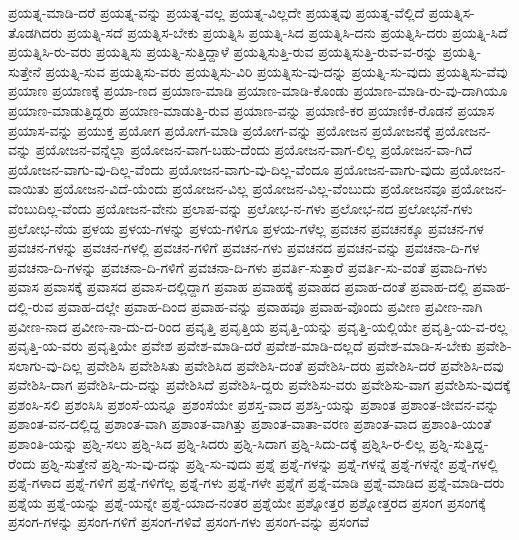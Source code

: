 {ಪ್ರಯತ್ನ-ಮಾಡಿ-ದರೆ
ಪ್ರಯತ್ನ-ವನ್ನು
ಪ್ರಯತ್ನ-ವಲ್ಲ
ಪ್ರಯತ್ನ-ವಿಲ್ಲದೇ
ಪ್ರಯತ್ನವು
ಪ್ರಯತ್ನ-ವೆಲ್ಲಿದೆ
ಪ್ರಯತ್ನಿಸ-ತೊಡಗಿದರು
ಪ್ರಯತ್ನಿ-ಸದೆ
ಪ್ರಯತ್ನಿಸ-ಬೇಕು
ಪ್ರಯತ್ನಿಸಿ
ಪ್ರಯತ್ನಿ-ಸಿದ
ಪ್ರಯತ್ನಿಸಿ-ದನು
ಪ್ರಯತ್ನಿಸಿ-ದರು
ಪ್ರಯತ್ನಿ-ಸಿದೆ
ಪ್ರಯತ್ನಿಸಿ-ರು-ವರು
ಪ್ರಯತ್ನಿಸು
ಪ್ರಯತ್ನಿ-ಸುತ್ತಿದ್ದಾಳೆ
ಪ್ರಯತ್ನಿಸುತ್ತಿ-ರುವ
ಪ್ರಯತ್ನಿಸುತ್ತಿ-ರುವ-ವ-ರನ್ನು
ಪ್ರಯತ್ನಿ-ಸುತ್ತೇನೆ
ಪ್ರಯತ್ನಿ-ಸುವ
ಪ್ರಯತ್ನಿಸು-ವರು
ಪ್ರಯತ್ನಿಸು-ವಿರಿ
ಪ್ರಯತ್ನಿಸು-ವು-ದನ್ನು
ಪ್ರಯತ್ನಿ-ಸು-ವುದು
ಪ್ರಯತ್ನಿಸು-ವೆವು
ಪ್ರಯಾಣ
ಪ್ರಯಾಣಕ್ಕೆ
ಪ್ರಯಾ-ಣದ
ಪ್ರಯಾಣ-ಮಾಡಿ
ಪ್ರಯಾಣ-ಮಾಡಿ-ಕೊಂಡು
ಪ್ರಯಾಣ-ಮಾಡಿ-ರು-ವು-ದಾಗಿಯೂ
ಪ್ರಯಾಣ-ಮಾಡುತ್ತಿದ್ದರು
ಪ್ರಯಾಣ-ಮಾಡುತ್ತಿ-ರುವ
ಪ್ರಯಾಣ-ವನ್ನು
ಪ್ರಯಾಣಿ-ಕರ
ಪ್ರಯಾಣಿಕ-ರೊಡನೆ
ಪ್ರಯಾಸ
ಪ್ರಯಾಸ-ವನ್ನು
ಪ್ರಯುಕ್ತ
ಪ್ರಯೋಗ
ಪ್ರಯೋಗ-ಮಾಡಿ
ಪ್ರಯೋಗ-ವನ್ನು
ಪ್ರಯೋಜನ
ಪ್ರಯೋಜನಕ್ಕೆ
ಪ್ರಯೋಜನ-ವನ್ನು
ಪ್ರಯೋಜನ-ವನ್ನೆಲ್ಲಾ
ಪ್ರಯೋಜನ-ವಾಗ-ಬಹು-ದೆಂದು
ಪ್ರಯೋಜನ-ವಾಗ-ಲಿಲ್ಲ
ಪ್ರಯೋಜನ-ವಾ-ಗಿದೆ
ಪ್ರಯೋಜನ-ವಾಗು-ವು-ದಿಲ್ಲ-ವೆಂದು
ಪ್ರಯೋಜನ-ವಾಗು-ವು-ದಿಲ್ಲ-ವೆಂದೂ
ಪ್ರಯೋಜನ-ವಾಗು-ವುದು
ಪ್ರಯೋಜನ-ವಾಯಿತು
ಪ್ರಯೋಜನ-ವಿದೆ-ಯೆಂದು
ಪ್ರಯೋಜನ-ವಿಲ್ಲ
ಪ್ರಯೋಜನ-ವಿಲ್ಲ-ವೆಂಬುದು
ಪ್ರಯೋಜನವೂ
ಪ್ರಯೋಜನ-ವೆಂಬುದಿಲ್ಲ-ವೆಂದು
ಪ್ರಯೋಜನ-ವೇನು
ಪ್ರಲಾಪ-ವನ್ನು
ಪ್ರಲೋಭ-ನ-ಗಳು
ಪ್ರಲೋಭ-ನದ
ಪ್ರಲೋಭನೆ-ಗಳು
ಪ್ರಲೋಭ-ನೆಯ
ಪ್ರಳಯ
ಪ್ರಳಯ-ಗಳನ್ನು
ಪ್ರಳಯ-ಗಳಿಗೂ
ಪ್ರಳಯ-ಗಳೆಲ್ಲ
ಪ್ರವಚನ
ಪ್ರವಚನಕ್ಕೂ
ಪ್ರವಚನ-ಗಳ
ಪ್ರವಚನ-ಗಳನ್ನು
ಪ್ರವಚನ-ಗಳಲ್ಲಿ
ಪ್ರವಚನ-ಗಳಿಗೆ
ಪ್ರವಚನ-ಗಳು
ಪ್ರವಚನದ
ಪ್ರವಚನ-ವನ್ನು
ಪ್ರವಚನಾ-ದಿ-ಗಳ
ಪ್ರವಚನಾ-ದಿ-ಗಳನ್ನು
ಪ್ರವಚನಾ-ದಿ-ಗಳಿಗೆ
ಪ್ರವಚನಾ-ದಿ-ಗಳು
ಪ್ರವರ್ತಿ-ಸುತ್ತಾರೆ
ಪ್ರವರ್ತಿ-ಸು-ವಂತೆ
ಪ್ರವಾದಿ-ಗಳು
ಪ್ರವಾಸ
ಪ್ರವಾಸಕ್ಕೆ
ಪ್ರವಾಸದ
ಪ್ರವಾಸ-ದಲ್ಲಿದ್ದಾಗ
ಪ್ರವಾಹ
ಪ್ರವಾಹಕ್ಕೆ
ಪ್ರವಾಹದ
ಪ್ರವಾಹ-ದಂತೆ
ಪ್ರವಾಹ-ದಲ್ಲಿ
ಪ್ರವಾಹ-ದಲ್ಲಿ-ರುವ
ಪ್ರವಾಹ-ದಲ್ಲೇ
ಪ್ರವಾಹ-ದಿಂದ
ಪ್ರವಾಹ-ವನ್ನು
ಪ್ರವಾಹವೂ
ಪ್ರವಾಹ-ವೊಂದು
ಪ್ರವೀಣ
ಪ್ರವೀಣ-ನಾಗಿ
ಪ್ರವೀಣ-ನಾದ
ಪ್ರವೀಣ-ನಾ-ದು-ದ-ರಿಂದ
ಪ್ರವೃತ್ತಿ
ಪ್ರವೃತ್ತಿಯ
ಪ್ರವೃತ್ತಿ-ಯನ್ನು
ಪ್ರವೃತ್ತಿ-ಯಲ್ಲಿಯೇ
ಪ್ರವೃತ್ತಿ-ಯ-ವ-ರಲ್ಲ
ಪ್ರವೃತ್ತಿ-ಯ-ವರು
ಪ್ರವೃತ್ತಿಯೇ
ಪ್ರವೇಶ
ಪ್ರವೇಶ-ಮಾಡಿ-ದರೆ
ಪ್ರವೇಶ-ಮಾಡಿ-ದಲ್ಲದೆ
ಪ್ರವೇಶ-ಮಾಡಿ-ಸ-ಬೇಕು
ಪ್ರವೇಶಿ-ಸಲಾಗು-ವು-ದಿಲ್ಲ
ಪ್ರವೇಶಿಸಿ
ಪ್ರವೇಶಿಸಿತು
ಪ್ರವೇಶಿಸಿದ
ಪ್ರವೇಶಿಸಿ-ದಂತೆ
ಪ್ರವೇಶಿಸಿ-ದರು
ಪ್ರವೇಶಿಸಿ-ದರೆ
ಪ್ರವೇಶಿಸಿ-ದವು
ಪ್ರವೇಶಿಸಿ-ದಾಗ
ಪ್ರವೇಶಿಸಿ-ದು-ದನ್ನು
ಪ್ರವೇಶಿಸಿದೆ
ಪ್ರವೇಶಿಸಿ-ದ್ದರು
ಪ್ರವೇಶಿಸು-ವರು
ಪ್ರವೇಶಿಸು-ವಾಗ
ಪ್ರವೇಶಿಸು-ವುದಕ್ಕೆ
ಪ್ರಶಂಸಿ-ಸಲಿ
ಪ್ರಶಂಸಿಸಿ
ಪ್ರಶಂಸೆ-ಯನ್ನೂ
ಪ್ರಶಂಸೆಯೇ
ಪ್ರಶಸ್ತ-ವಾದ
ಪ್ರಶಸ್ತಿ-ಯನ್ನು
ಪ್ರಶಾಂತ
ಪ್ರಶಾಂತ-ಜೀವನ-ವನ್ನು
ಪ್ರಶಾಂತ-ವನ-ದಲ್ಲಿದ್ದ
ಪ್ರಶಾಂತ-ವಾಗಿ
ಪ್ರಶಾಂತ-ವಾಗಿತ್ತು
ಪ್ರಶಾಂತ-ವಾತಾ-ವರಣ
ಪ್ರಶಾಂತ-ವಾದ
ಪ್ರಶಾಂತಿ-ಯಂತೆ
ಪ್ರಶಾಂತಿ-ಯನ್ನು
ಪ್ರಶ್ನಿ-ಸಲು
ಪ್ರಶ್ನಿ-ಸಿದ
ಪ್ರಶ್ನಿ-ಸಿದರು
ಪ್ರಶ್ನಿ-ಸಿದಾಗ
ಪ್ರಶ್ನಿ-ಸಿದು-ದಕ್ಕೆ
ಪ್ರಶ್ನಿಸಿ-ರ-ಲಿಲ್ಲ
ಪ್ರಶ್ನಿ-ಸುತ್ತಿದ್ದ-ರೆಂದು
ಪ್ರಶ್ನಿ-ಸುತ್ತೇನೆ
ಪ್ರಶ್ನಿ-ಸು-ವು-ದನ್ನು
ಪ್ರಶ್ನಿ-ಸು-ವುದು
ಪ್ರಶ್ನೆ
ಪ್ರಶ್ನೆ-ಗಳನ್ನು
ಪ್ರಶ್ನೆ-ಗಳನ್ನೆ
ಪ್ರಶ್ನೆ-ಗಳನ್ನೇ
ಪ್ರಶ್ನೆ-ಗಳಲ್ಲಿ
ಪ್ರಶ್ನೆ-ಗಳಾದ
ಪ್ರಶ್ನೆ-ಗಳಿಗೆ
ಪ್ರಶ್ನೆ-ಗಳಿಗೆಲ್ಲ
ಪ್ರಶ್ನೆ-ಗಳು
ಪ್ರಶ್ನೆ-ಗಳೇ
ಪ್ರಶ್ನೆಗೆ
ಪ್ರಶ್ನೆ-ಮಾಡಿ
ಪ್ರಶ್ನೆ-ಮಾಡಿದ
ಪ್ರಶ್ನೆ-ಮಾಡಿ-ದರು
ಪ್ರಶ್ನೆಯ
ಪ್ರಶ್ನೆ-ಯನ್ನು
ಪ್ರಶ್ನೆ-ಯನ್ನೇ
ಪ್ರಶ್ನೆ-ಯಾದ-ನಂತರ
ಪ್ರಶ್ನೆಯೇ
ಪ್ರಶ್ನೋತ್ತರ
ಪ್ರಶ್ನೋತ್ತರದ
ಪ್ರಸಂಗ
ಪ್ರಸಂಗಕ್ಕೆ
ಪ್ರಸಂಗ-ಗಳನ್ನು
ಪ್ರಸಂಗ-ಗಳಿಗೆ
ಪ್ರಸಂಗ-ಗಳಿವೆ
ಪ್ರಸಂಗ-ಗಳು
ಪ್ರಸಂಗ-ವನ್ನು
ಪ್ರಸಂಗವೆ
}
